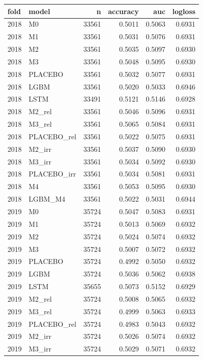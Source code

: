 \begin{tabular}{llrrrr}
\toprule
fold & model & n & accuracy & auc & logloss \\
\midrule
2018 & M0 & 33561 & 0.5011 & 0.5063 & 0.6931 \\
2018 & M1 & 33561 & 0.5031 & 0.5076 & 0.6931 \\
2018 & M2 & 33561 & 0.5035 & 0.5097 & 0.6930 \\
2018 & M3 & 33561 & 0.5048 & 0.5095 & 0.6930 \\
2018 & PLACEBO & 33561 & 0.5032 & 0.5077 & 0.6931 \\
2018 & LGBM & 33561 & 0.5020 & 0.5033 & 0.6946 \\
2018 & LSTM & 33491 & 0.5121 & 0.5146 & 0.6928 \\
2018 & M2\_rel & 33561 & 0.5046 & 0.5096 & 0.6931 \\
2018 & M3\_rel & 33561 & 0.5065 & 0.5084 & 0.6931 \\
2018 & PLACEBO\_rel & 33561 & 0.5022 & 0.5075 & 0.6931 \\
2018 & M2\_irr & 33561 & 0.5037 & 0.5090 & 0.6930 \\
2018 & M3\_irr & 33561 & 0.5034 & 0.5092 & 0.6930 \\
2018 & PLACEBO\_irr & 33561 & 0.5034 & 0.5081 & 0.6931 \\
2018 & M4 & 33561 & 0.5053 & 0.5095 & 0.6930 \\
2018 & LGBM\_M4 & 33561 & 0.5022 & 0.5031 & 0.6944 \\
2019 & M0 & 35724 & 0.5047 & 0.5083 & 0.6931 \\
2019 & M1 & 35724 & 0.5013 & 0.5069 & 0.6932 \\
2019 & M2 & 35724 & 0.5024 & 0.5074 & 0.6932 \\
2019 & M3 & 35724 & 0.5007 & 0.5072 & 0.6932 \\
2019 & PLACEBO & 35724 & 0.4992 & 0.5050 & 0.6932 \\
2019 & LGBM & 35724 & 0.5036 & 0.5062 & 0.6938 \\
2019 & LSTM & 35655 & 0.5073 & 0.5152 & 0.6929 \\
2019 & M2\_rel & 35724 & 0.5008 & 0.5065 & 0.6932 \\
2019 & M3\_rel & 35724 & 0.4999 & 0.5063 & 0.6933 \\
2019 & PLACEBO\_rel & 35724 & 0.4983 & 0.5043 & 0.6932 \\
2019 & M2\_irr & 35724 & 0.5026 & 0.5074 & 0.6932 \\
2019 & M3\_irr & 35724 & 0.5029 & 0.5071 & 0.6932 \\

\end{tabular}
